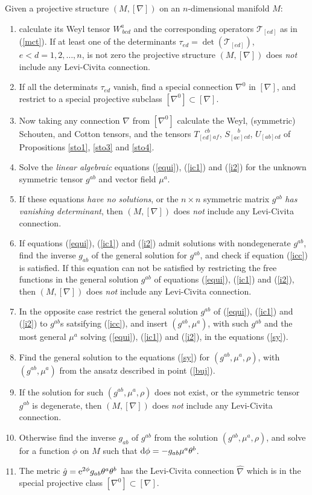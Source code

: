 \documentclass[letterpaper]{amsart}
\theoremstyle{definition}
\theoremstyle{remark}
\newcommand{\der}{{\rm d}}
\begin{document}
Given a projective structure $(M,[\nabla])$ on an $n$-dimensional
manifold $M$:
\begin{enumerate}
\item calculate its Weyl tensor $W^a_{~bcd}$ and the corresponding
  operators ${\mathcal T}_{[ed]}$ as in (\ref{mct}). If at least one
  of the determinants $\tau_{ed}=\det({\mathcal T}_{[ed]})$,
  $e<d=1,2,\dots,n$, is not zero the projective structure
  $(M,[\nabla])$ does \emph{not} include any Levi-Civita connection.
\item If all the determinats  $\tau_{ed}$ vanish, find a special
  connection $\nabla^0$ in $[\nabla]$, and restrict to a special
  projective subclass $[\nabla^0]\subset[\nabla]$.
\item Now taking any connection $\nabla$ from $[\nabla^0]$ calculate
  the Weyl, (symmetric) Schouten, and Cotton tensors, and the tensors
  $T_{[ed]}^{\quad cb}\phantom{}_{af}$, $S_{[ae]}^{\quad \,\, b}\phantom{}_{cd}$, $U_{[ab]cd}$ of
  Propositions \ref{sto1}, \ref{sto3} and \ref{sto4}. 
\item\label{bui} Solve the \emph{linear algebraic} equations (\ref{equi}),
  (\ref{ic1}) and (\ref{i2}) for the unknown symmetric tensor $g^{ab}$
  and vector field $\mu^a$. 
\item If these equations \emph{have no solutions}, or the $n\times n$
  symmetric matrix
  $g^{ab}$ \emph{has vanishing determinant}, then $(M,[\nabla])$ does \emph{not} include any Levi-Civita connection.
\item If equations (\ref{equi}), (\ref{ic1}) and (\ref{i2}) admit
  solutions with nondegenerate $g^{ab}$, find the inverse $g_{ab}$ of
  the general solution for $g^{ab}$, and check if equation (\ref{icc})
  is satisfied. If this equation can not be satisfied by restricting
  the free functions in the general solution $g^{ab}$ of equations (\ref{equi}),
  (\ref{ic1}) and (\ref{i2}), then $(M,[\nabla])$ does \emph{not} include any Levi-Civita connection.   
\item \label{buj}In the opposite case restrict the general solution $g^{ab}$ of (\ref{equi}),
  (\ref{ic1}) and (\ref{i2}) to $g^{ab}$s satsifying (\ref{icc}), and
  insert $(g^{ab}, \mu^a)$, with such $g^{ab}$ and the most general $\mu^a$
  solving (\ref{equi}),
  (\ref{ic1}) and (\ref{i2}), in the equations
  (\ref{sy}). 
\item \label{buk}Find the general solution to the equations (\ref{sy}) for
  $(g^{ab},\mu^a,\rho)$, with $(g^{ab},\mu^a)$ from the ansatz
  described in point (\ref{buj}).
\item If the solution for such $(g^{ab},\mu^a,\rho)$ does not
  exist, or the symmetric tensor $g^{ab}$ is degenerate, then
  $(M,[\nabla])$ does \emph{not} include any Levi-Civita connection.
\item \label{bum}Otherwise find the inverse $g_{ab}$ of $g^{ab}$ from the
  solution $(g^{ab},\mu^a,\rho)$, and solve for a function $\phi$ on
  $M$ such that
  $\der\phi=-g_{ab}\mu^a\theta^b$. 
\item The metric $\hat{g}={\rm e}^{2\phi}g_{ab}\theta^a\theta^b$ has
  the Levi-Civita connection $\hat{\nabla}$ which is in the special
  projective class $[\nabla^0]\subset[\nabla]$. 
\end{enumerate}
\end{document}
